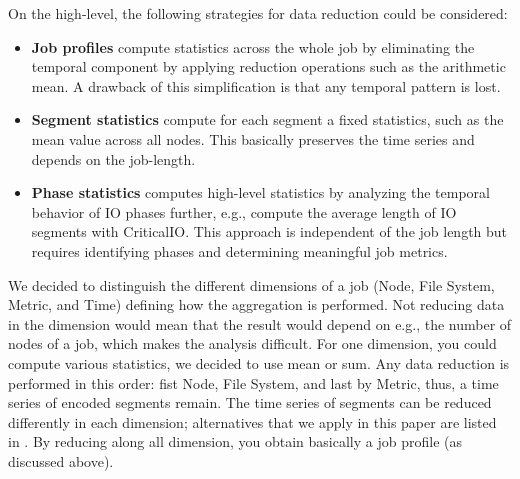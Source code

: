 \documentclass[]{llncs}
\begin{document}
On the high-level, the following strategies for data reduction could be considered:
\begin{itemize}
	\item \textbf{Job profiles} compute statistics across the whole job by eliminating the temporal component by applying reduction operations such as the arithmetic mean.
		A drawback of this simplification is that any temporal pattern is lost.
	\item \textbf{Segment statistics} compute for each segment a fixed statistics, such as the mean value across all nodes.
		This basically preserves the time series and depends on the job-length.
	\item \textbf{Phase statistics} computes high-level statistics by analyzing the temporal behavior of IO phases further, e.g., compute the average length of IO segments with CriticalIO.
		This approach is independent of the job length but requires identifying phases and determining meaningful job metrics.
\end{itemize}

We decided to distinguish the different dimensions of a job (Node, File System, Metric, and Time) defining how the aggregation is performed.
Not reducing data in the dimension would mean that the result would depend on e.g., the number of nodes of a job, which makes the analysis difficult.
For one dimension, you could compute various statistics, we decided to use mean or sum.
Any data reduction is performed in this order: fist Node, File System, and last by Metric, thus, a time series of encoded segments remain.
The time series of segments can be reduced differently in each dimension; alternatives that we apply in this paper are listed in .
By reducing along all dimension, you obtain basically a job profile (as discussed above).
\end{document}
